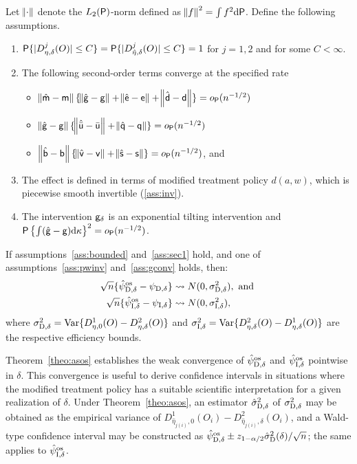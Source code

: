 \begin{theorem}\label{theo:asos}
  Let $\norm{\cdot}$ denote the $L_2(\P)$-norm defined as
  $\norm{f}^2 = \int f^2 \dd \P$. Define the following assumptions.
  \begin{enumerate}[label=(\roman*)]
  \item \label{ass:bounded}
    $\P\{|D_{\eta, \delta}^j(O)| \leq C \} = \P \{| D_{\hat{\eta},
      \delta}^j(O) | \leq C \} = 1$ for $j=1,2$ and for some
    $C < \infty$.
  \item The following second-order terms converge at the specified rate
    \label{ass:sec1}
    \begin{itemize}
    \item  $\norm{\hat{\m} - \m} \{\norm{\hat{\g} - \g} +
        \norm{\hat{\e} - \e} + \norm{\hat{\d} - \d}\} = o_\P(n^{-1/2})$
  \item $\norm{\hat{\g} - \g}\{\norm{\hat{\bar\uu} -
      \bar\uu} + \norm{\hat{\q} - \q}\} = o_\P(n^{-1/2})$
  \item $\norm{\hat{\b} - \b}\{\norm{\hat{\vv} - \vv} +
    \norm{\hat{\s} - \s}\} = o_\P(n^{-1/2})$, and
    \end{itemize}
  \item \label{ass:pwinv} The effect is defined in terms of modified treatment
    policy $d(a,w)$, which is piecewise smooth invertible (\ref{ass:inv}).
  \item \label{ass:gconv} The intervention $\g_\delta$ is an
    exponential tilting intervention and
    $\P\left\{ \int(\hat{\g} - \g) \dd\kappa \right\}^2 =
    o_\P(n^{-1/2})$.
  \end{enumerate}
  If assumptions~\ref{ass:bounded} and~\ref{ass:sec1} hold, and one of
  assumptions~\ref{ass:pwinv} and~\ref{ass:gconv} holds, then:
  \begin{align*}
    \sqrt{n}\{\psidos - \psid\} &\rightsquigarrow N(0,
    \sigma^2_{\mbox{\scriptsize D},\delta}),\text{ and }\\
    \sqrt{n}\{\psiios - \psii\} &\rightsquigarrow N(0,
                                  \sigma^2_{\mbox{\scriptsize I},\delta}),
  \end{align*}
  where
  $\sigma^2_{\mbox{\scriptsize D},\delta} = \var\{D_{\eta, 0}^1(O)
  -D_{\eta, \delta}^2(O)\}$ and $\sigma^2_{\mbox{\scriptsize I},\delta} =
  \var\{D_{\eta, \delta}^2(O) - D_{\eta, \delta}^1(O)\}$ are the respective
  efficiency bounds.
\end{theorem}

Theorem~\ref{theo:asos} establishes the weak convergence of $\psidos$ and
$\psiios$ pointwise in $\delta$. This convergence is useful to derive confidence
intervals in situations where the modified treatment policy has a suitable
scientific interpretation for a given realization of $\delta$. Under
Theorem~\ref{theo:asos}, an estimator $\hat\sigma^2_{\mbox{\scriptsize
D},\delta}$ of $\sigma^2_{\mbox{\scriptsize D},\delta}$ may be obtained as the
empirical variance of $D_{\hat\eta_{j(i)}, 0}^1(O_i) - D_{\hat\eta_{j(i)},
\delta}^2(O_i)$, and a Wald-type confidence interval may be constructed as
$\psidos\pm z_{1-\alpha/2} \hat\sigma^2_{\mbox{\scriptsize
D}}(\delta)/\sqrt{n}$; the same applies to $\psiios$.

